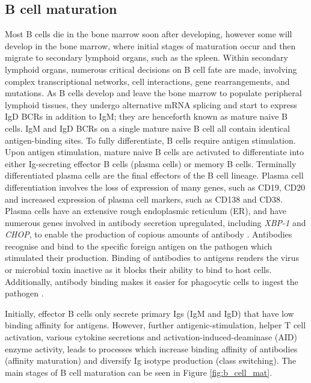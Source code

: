 \subsection{B cell maturation}
Most B cells die in the bone marrow soon after developing, however some will develop in the bone marrow, where initial stages of maturation occur and then migrate to secondary lymphoid organs, such as the spleen.
Within secondary lymphoid organs, numerous critical decisions on B cell fate are made, involving complex transcriptional networks, cell interactions, gene rearrangements, and mutations\cite{roth2014tracking, jourdan2011characterization}.
As B cells develop and leave the bone marrow to populate peripheral lymphoid tissues, they undergo alternative mRNA splicing and start to express IgD BCRs in addition to IgM; they are henceforth known as mature naive B cells.
IgM and IgD BCRs on a single mature naive B cell all contain identical antigen-binding sites.
To fully differentiate, B cells require antigen stimulation.
Upon antigen stimulation, mature naive B cells are activated to differentiate into either Ig-secreting effector B cells (plasma cells) or memory B cells.
Terminally differentiated plasma cells are the final effectors of the B cell lineage.
Plasma cell differentiation involves the loss of expression of many genes, such as CD19, CD20 and increased expression of plasma cell markers, such as CD138 and CD38.
Plasma cells have an extensive rough endoplasmic reticulum (ER), and have numerous genes involved in antibody secretion upregulated, including \textit{XBP-1} and \textit{CHOP}, to enable the production of copious amounts of antibody \cite{shapiro2004plasma}.
Antibodies recognise and bind to the specific foreign antigen on the pathogen which stimulated their production.
Binding of antibodies to antigens renders the virus or microbial toxin inactive as it blocks their ability to bind to host cells.
Additionally, antibody binding makes it easier for phagocytic cells to ingest the pathogen \cite{alberts2007molecularimmune}.

Initially, effector B cells only secrete primary Igs (IgM and IgD) that have low binding affinity for antigens.
However, further antigenic-stimulation, helper T cell activation, various cytokine secretions and activation-induced-deaminase (AID) enzyme activity, leads to processes which increase binding affinity of antibodies (affinity maturation) and diversify Ig isotype production (class switching).
The main stages of B cell maturation can be seen in Figure \ref{fig:b_cell_mat}.

